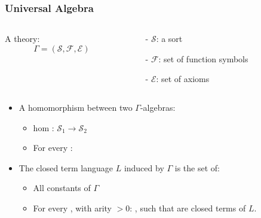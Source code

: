 \documentclass[t,10pt,numbers,fleqn,usenames,xcolor=dvipsnames]{beamer}
\begin{document}
\begin{frame}[fragile]
\frametitle{Universal Algebra}  
\begin{columns}
\begin{column}{0.2\textwidth}
A theory: \newline 
\[\Gamma = (\mathcal{S},\mathcal{F},\mathcal{E}) \]
\end{column}
\begin{column}{0.45\textwidth} 
\begin{itemize}
\item[-] $\mathcal{S}$: a sort
\item[-] $\mathcal{F}$: set of function symbols
\item[-] $\mathcal{E}$: set of axioms
\end{itemize}
\end{column} 
\end{columns} 
\pause
\vspace{0.5cm}
\begin{itemize}
\item A homomorphism between two $\Gamma$-algebras:  
\begin{itemize}
\item hom : $\mathcal{S}_1 \to \mathcal{S}_2$ 
\item For every : \newline  
\end{itemize}
\vspace{0.5cm}
\item The closed term language $L$ induced by $\Gamma$ is the set of: 
\begin{itemize}
\item All constants of $\Gamma$  
\item For every , with arity $> 0$: \newline 
, such that  are closed terms of $L$.
\end{itemize}

\end{itemize}
\end{frame}
\end{document}
